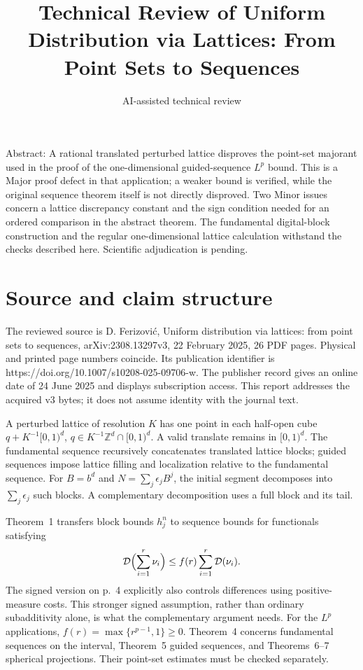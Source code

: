 \documentclass[10pt]{article}
\title{Technical Review of Uniform Distribution
via Lattices: From Point Sets to Sequences}
\author{AI-assisted technical review}
\date{}
\begin{document}
\maketitle
Abstract: A rational translated perturbed lattice disproves the point-set majorant used in the proof of the one-dimensional guided-sequence \(L^p\) bound. This is a Major proof defect in that application; a weaker bound is verified, while the original sequence theorem itself is not directly disproved. Two Minor issues concern a lattice discrepancy constant and the sign condition needed for an ordered comparison in the abstract theorem. The fundamental digital-block construction and the regular one-dimensional lattice calculation withstand the checks described here. Scientific adjudication is pending.\par
\section*{Source and claim structure}
The reviewed source is D. Ferizović, Uniform distribution via lattices: from point sets to sequences, arXiv:2308.13297v3, 22 February 2025, 26 PDF pages. Physical and printed page numbers coincide. Its publication identifier is https://doi.org/10.1007/s10208-025-09706-w. The publisher record gives an online date of 24 June 2025 and displays subscription access. This report addresses the acquired v3 bytes; it does not assume identity with the journal text.\par
A perturbed lattice of resolution \(K\) has one point in each half-open cube \(q+K^{-1}[0,1)^d\), \(q\in K^{-1}\mathbb Z^d\cap[0,1)^d\). A valid translate remains in \([0,1)^d\). The fundamental sequence recursively concatenates translated lattice blocks; guided sequences impose lattice filling and localization relative to the fundamental sequence. For \(B=b^d\) and \(N=\sum_j\epsilon_jB^j\), the initial segment decomposes into \(\sum_j\epsilon_j\) such blocks. A complementary decomposition uses a full block and its tail.\par
Theorem 1 transfers block bounds \(h_j^n\) to sequence bounds for functionals satisfying \[\mathcal D\Bigl(\sum_{i=1}^r\nu_i\Bigr)
       \le f(r)\sum_{i=1}^r\mathcal D(\nu_i).\] The signed version on p. 4 explicitly also controls differences using positive-measure costs. This stronger signed assumption, rather than ordinary subadditivity alone, is what the complementary argument needs. For the \(L^p\) applications, \(f(r)=\max\{r^{p-1},1\}\ge0\). Theorem 4 concerns fundamental sequences on the interval, Theorem 5 guided sequences, and Theorems 6–7 spherical projections. Their point-set estimates must be checked separately.\par
\end{document}
